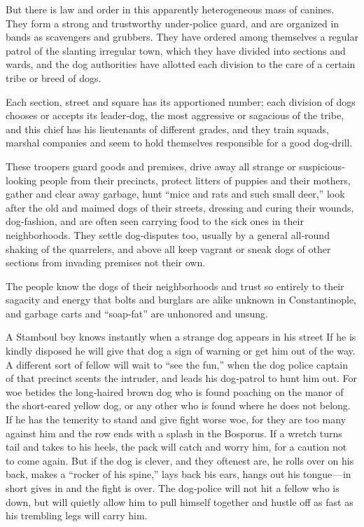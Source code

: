 \documentclass[12pt]{book}
\begin{document}
But there is law and order in this apparently heterogeneous mass of canines.
They form a strong and trustworthy under‐police guard, and are organized in
bands as scavengers and grubbers. They have ordered among themselves a regular
patrol of the slanting irregular town, which they have divided into sections and
wards, and the dog authorities have allotted each division to the care of a certain
tribe or breed of dogs.

Each section, street and square has its apportioned number; each division of
dogs chooses or accepts its leader‐dog, the most aggressive or sagacious of the
tribe, and this chief has his lieutenants of different grades, and they train squads,
marshal companies and seem to hold themselves responsible for a good dog‐drill.

These troopers guard goods and premises, drive away all strange or suspicious‐looking people from their precincts, protect litters of puppies and their
mothers, gather and clear away garbage, hunt “mice and rats and such small
deer,” look after the old and maimed dogs of their streets, dressing and curing
their wounds, dog‐fashion, and are often seen carrying food to the sick ones in
their neighborhoods. They settle dog‐disputes too, usually by a general all‐round
shaking of the quarrelers, and above all keep vagrant or sneak dogs of other
sections from invading premises not their own.

The people know the dogs of their neighborhoods and trust so entirely to their
sagacity and energy that bolts and burglars are alike unknown in Constantinople,
and garbage carts and “soap‐fat” are unhonored and unsung.

A Stamboul boy knows instantly when a strange dog appears in his street If
he is kindly disposed he will give that dog a sign of warning or get him out of
the way. A different sort of fellow will wait to “see the fun,” when the dog police
captain of that precinct scents the intruder, and leads his dog‐patrol to hunt him
out. For woe betides the long‐haired brown dog who is found poaching on the
manor of the short‐eared yellow dog, or any other who is found where he does
not belong. If he has the temerity to stand and give fight worse woe, for they
are too many against him and the row ends with a splash in the Bosporus. If a
wretch turns tail and takes to his heels, the pack will catch and worry him, for
a caution not to come again. But if the dog is clever, and they oftenest are, he
rolls over on his back, makes a “rocker of his spine,” lays back bis ears, hangs out
his tongue — in short gives in and the fight is over. The dog‐police will not hit a
fellow who is down, but will quietly allow him to pull himself together and hustle
off as fast as his trembling legs will carry him.
\end{document}
